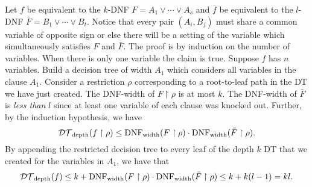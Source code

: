 \documentclass[11pt]{article}
\begin{document}
	Let $f$ be equivalent to the $k$-DNF $F = A_1 \lor \cdots \lor A_s$ and $\bar{f}$ be equivalent to the $l$-DNF $\bar{F} = B_1 \lor \cdots \lor B_t$. Notice that every pair $(A_i, B_j)$ must share a common variable of opposite sign or else there will be a setting of the variable which simultaneously satisfies $F$ and $\bar{F}$. The proof is by induction on the number of variables. When there is only one variable the claim is true. Suppose $f$ has $n$ variables. Build a decision tree of width $A_1$ which considers all variables in the clause $A_1$. Consider a restriction $\rho$ corresponding to a root-to-leaf path in the DT we have just created. The DNF-width of $F \upharpoonright \rho$ is at most $k$. The DNF-width of $\bar{F}$ is \emph{less than} $l$ since at least one variable of each clause was knocked out. Further, by the induction hypothesis, we have
	\[\mathcal{DT}_{\mathrm{depth}}(f \upharpoonright \rho) \leq \mathrm{DNF}_{\mathrm{width}}(F \upharpoonright \rho) \cdot \mathrm{DNF}_{\mathrm{width}}(\bar{F} \upharpoonright \rho).\]
	By appending the restricted decision tree to every leaf of the depth $k$ DT that we created for the variables in $A_1$, we have that
	\[\mathcal{DT}_{\mathrm{depth}}(f) \leq k + \mathrm{DNF}_{\mathrm{width}}(F \upharpoonright \rho) \cdot \mathrm{DNF}_{\mathrm{width}}(\bar{F} \upharpoonright \rho) \leq k + k(l-1) = kl.\]
	
\end{document}
